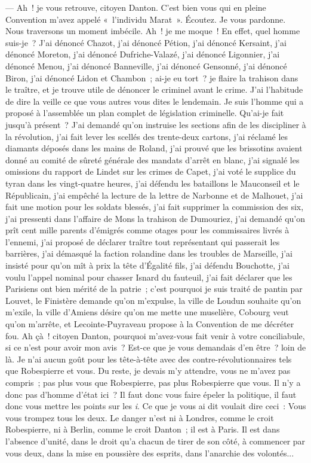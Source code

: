 \documentclass[french,twoside]{book} %
\begin{document}
— Ah ! je vous retrouve, citoyen Danton. C’est bien vous qui en pleine Convention m’avez appelé « l’individu Marat ». Écoutez. Je vous pardonne. Nous traversons un moment imbécile. Ah ! je me moque ! En effet, quel homme suis-je ? J’ai dénoncé Chazot, j’ai dénoncé Pétion, j’ai dénoncé Kersaint, j’ai dénoncé Moreton, j’ai dénoncé Dufriche-Valazé, j’ai dénoncé Ligonnier, j’ai dénoncé Menou, j’ai dénoncé Banneville, j’ai dénoncé Gensonné, j’ai dénoncé Biron, j’ai dénoncé Lidon et Chambon ; ai-je eu tort ? je flaire la trahison dans le traître, et je trouve utile de dénoncer le criminel avant le crime. J’ai l’habitude de dire la veille ce que vous autres vous dites le lendemain. Je suis l’homme qui a proposé à l’assemblée un plan complet de législation criminelle. Qu’ai-je fait jusqu’à présent ? J’ai demandé qu’on instruise les sections afin de les discipliner à la révolution, j’ai fait lever les scellés des trente-deux cartons, j’ai réclamé les diamants déposés dans les mains de Roland, j’ai prouvé que les brissotins avaient donné au comité de sûreté générale des mandats d’arrêt en blanc, j’ai signalé les omissions du rapport de Lindet sur les crimes de Capet, j’ai voté le supplice du tyran dans les vingt-quatre heures, j’ai défendu les bataillons le Mauconseil et le Républicain, j’ai empêché la lecture de la lettre de Narbonne et de  Malhouet, j’ai fait une motion pour les soldats blessés, j’ai fait supprimer la commission des six, j’ai pressenti dans l’affaire de Mons la trahison de Dumouriez, j’ai demandé qu’on prît cent mille parents d’émigrés comme otages pour les commissaires livrés à l’ennemi, j’ai proposé de déclarer traître tout représentant qui passerait les barrières, j’ai démasqué la faction rolandine dans les troubles de Marseille, j’ai insisté pour qu’on mît à prix la tête d’Égalité fils, j’ai défendu Bouchotte, j’ai voulu l’appel nominal pour chasser Isnard du fauteuil, j’ai fait déclarer que les Parisiens ont bien mérité de la patrie ; c’est pourquoi je suis traité de pantin par Louvet, le Finistère demande qu’on m’expulse, la ville de Loudun souhaite qu’on m’exile, la ville d’Amiens désire qu’on me mette une muselière, Cobourg veut qu’on m’arrête, et Lecointe-Puyraveau propose à la Convention de me décréter fou. Ah çà ! citoyen Danton, pourquoi m’avez-vous fait venir à votre conciliabule, si ce n’est pour avoir mon avis ? Est-ce que je vous demandais d’en être ? loin de là. Je n’ai aucun goût pour les tête-à-tête avec des contre-révolutionnaires tels que Robespierre et vous. Du reste, je devais m’y attendre, vous ne m’avez pas compris ; pas plus vous que Robespierre, pas plus Robespierre que vous. Il n’y a donc pas d’homme d’état ici ? Il faut donc vous faire épeler la politique, il faut donc vous mettre les points sur les \emph{i}. Ce que je vous ai dit voulait dire ceci : Vous vous trompez tous les deux. Le danger n’est ni à Londres, comme le croit Robespierre, ni à Berlin, comme le croit Danton ;  il est à Paris. Il est dans l’absence d’unité, dans le droit qu’a chacun de tirer de son côté, à commencer par vous deux, dans la mise en poussière des esprits, dans l’anarchie des volontés...\par
\end{document}
